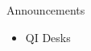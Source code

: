 \begin{frame}{Announcements}
    \begin{itemize}
        \item QI Desks
    \end{itemize}
\end{frame}
